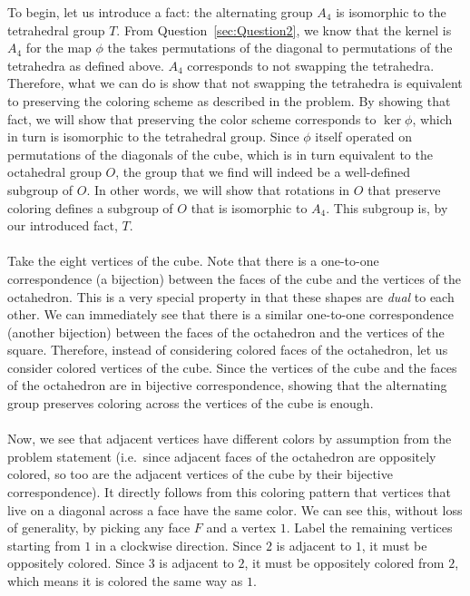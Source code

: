 \documentclass[letterpaper]{article}
\begin{document}
To begin, let us introduce a fact: the alternating group $ A_4 $ is isomorphic to the tetrahedral group $ T $.
From Question~\ref{sec:Question2}, we know that the kernel is $ A_4 $ for the map $ \phi $ the takes permutations of the diagonal to permutations of the tetrahedra as defined above.
$ A_4 $ corresponds to not swapping the tetrahedra.
Therefore, what we can do is show that not swapping the tetrahedra is equivalent to preserving the coloring scheme as described in the problem.
By showing that fact, we will show that preserving the color scheme corresponds to $ \ker{\phi} $, which in turn is isomorphic to the tetrahedral group.
Since $ \phi $ itself operated on permutations of the diagonals of the cube, which is in turn equivalent to the octahedral group $ O $, the group that we find will indeed be a well-defined subgroup of $ O $.
In other words, we will show that rotations in $ O $ that preserve coloring defines a subgroup of $ O $ that is isomorphic to $ A_4 $.
This subgroup is, by our introduced fact, $ T $.
\\ \\
Take the eight vertices of the cube.
Note that there is a one-to-one correspondence (a bijection) between the faces of the cube and the vertices of the octahedron.
This is a very special property in that these shapes are \textit{dual} to each other.
We can immediately see that there is a similar one-to-one correspondence (another bijection) between the faces of the octahedron and the vertices of the square.
Therefore, instead of considering colored faces of the octahedron, let us consider colored vertices of the cube.
Since the vertices of the cube and the faces of the octahedron are in bijective correspondence, showing that the alternating group preserves coloring across the vertices of the cube is enough.
\\ \\
Now, we see that adjacent vertices have different colors by assumption from the problem statement (i.e.\ since adjacent faces of the octahedron are oppositely colored, so too are the adjacent vertices of the cube by their bijective correspondence).
It directly follows from this coloring pattern that vertices that live on a diagonal across a face have the same color.
We can see this, without loss of generality, by picking any face $ F $ and a vertex $ 1 $.
Label the remaining vertices starting from $ 1 $ in a clockwise direction.
Since $ 2 $ is adjacent to $ 1 $, it must be oppositely colored.
Since $ 3 $ is adjacent to $ 2 $, it must be oppositely colored from $ 2 $, which means it is colored the same way as $ 1 $.
\end{document}
